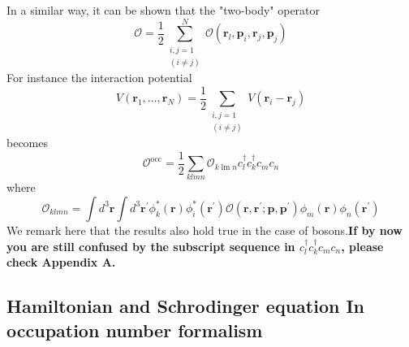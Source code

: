 In a similar way, it can be shown that the "two-body" operator
\begin{equation}\mathcal{O}=\frac{1}{2} \sum_{\substack{i, j=1\\(i \neq j)}}^{N} \mathcal{O}\left(\mathbf{r}_{l}, \mathbf{p}_{i}, \mathbf{r}_{j}, \mathbf{p}_{j}\right)\end{equation}
For instance the interaction potential
\begin{equation}V\left(\mathbf{r}_{1}, \dots, \mathbf{r}_{N}\right)=\frac{1}{2} \sum_{\substack{i, j=1\\ (i \neq j)}} V\left(\mathbf{r}_{i}-\mathbf{r}_{j}\right)\end{equation}
becomes
\begin{equation}\mathcal{O}^{\mathrm{occ}}=\frac{1}{2} \sum_{k l m n} \mathcal{O}_{k \operatorname{lm} n} c_{l}^{\dagger} c_{k}^{\dagger} c_{m} c_{n}\end{equation}
where
\begin{equation}\mathcal{O}_{klmn}=\int d^{3} \mathbf{r} \int d^{3} \mathbf{r}^{\prime} \phi_{k}^{*}(\mathbf{r}) \phi_{i}^{*}\left(\mathbf{r}^{\prime}\right) \mathcal{O}\left(\mathbf{r}, \mathbf{r}^{\prime} ; \mathbf{p}, \mathbf{p}^{\prime}\right) \phi_{m}(\mathbf{r}) \phi_{n}\left(\mathbf{r}^{\prime}\right)\end{equation}
We remark here that the results also hold true in the case of bosons.\textbf{If by now you are still confused by the subscript sequence in $c_l^{\dagger}c_k^{\dagger}c_mc_n$, please check Appendix A.}

\subsection{Hamiltonian and Schrodinger equation In occupation number formalism}